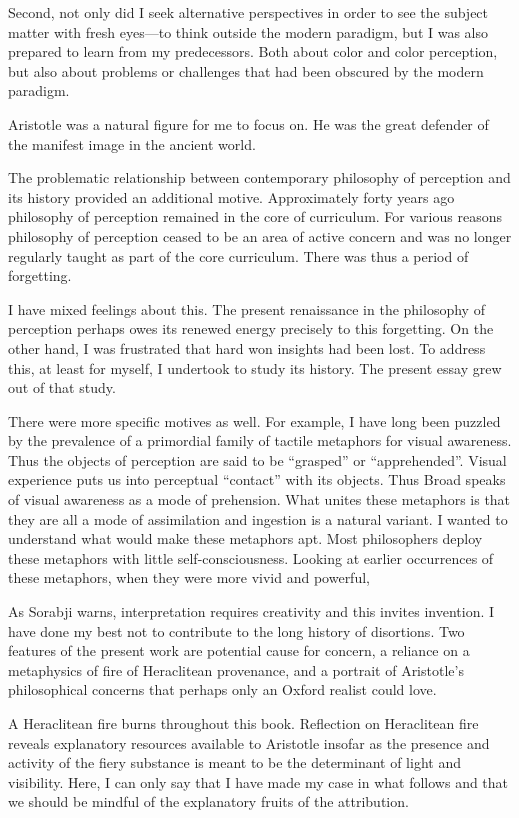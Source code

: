 Second, not only did I seek alternative perspectives in order to see the subject matter with fresh eyes---to think outside the modern paradigm, but I was also prepared to learn from my predecessors. Both about color and color perception, but also about problems or challenges that had been obscured by the modern paradigm. 

Aristotle was a natural figure for me to focus on. He was the great defender of the manifest image in the ancient world. 

The problematic relationship between contemporary philosophy of perception and its history provided an additional motive. Approximately forty years ago philosophy of perception remained in the core of curriculum. For various reasons philosophy of perception ceased to be an area of active concern and was no longer regularly taught as part of the core curriculum. There was thus a period of forgetting. 

I have mixed feelings about this. The present renaissance in the philosophy of perception perhaps owes its renewed energy precisely to this forgetting. On the other hand, I was frustrated that hard won insights had been lost. To address this, at least for myself, I undertook to study its history. The present essay grew out of that study.

There were more specific motives as well. For example, I have long been puzzled by the prevalence of a primordial family of tactile metaphors for visual awareness. Thus the objects of perception are said to be ``grasped'' or ``apprehended''. Visual experience puts us into perceptual ``contact'' with its objects. Thus Broad speaks of visual awareness as a mode of prehension. What unites these metaphors is that they are all a mode of assimilation and ingestion is a natural variant. I wanted to understand what would make these metaphors apt. Most philosophers deploy these metaphors with little self-consciousness. Looking at earlier occurrences of these metaphors, when they were more vivid and powerful, 

As Sorabji warns, interpretation requires creativity and this invites invention. I have done my best not to contribute to the long history of disortions. Two features of the present work are potential cause for concern, a reliance on a metaphysics of fire of Heraclitean provenance, and a portrait of Aristotle's philosophical concerns that perhaps only an Oxford realist could love. 

A Heraclitean fire burns throughout this book. Reflection on Heraclitean fire reveals explanatory resources available to Aristotle insofar as the presence and activity of the fiery substance is meant to be the determinant of light and visibility. Here, I can only say that I have made my case in what follows and that we should be mindful of the explanatory fruits of the attribution. 

